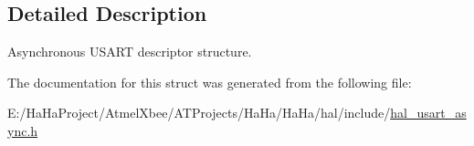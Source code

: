 \subsection{Detailed Description}
Asynchronous U\+S\+A\+RT descriptor structure. 

The documentation for this struct was generated from the following file\+:\begin{DoxyCompactItemize}
\item 
E\+:/\+Ha\+Ha\+Project/\+Atmel\+Xbee/\+A\+T\+Projects/\+Ha\+Ha/\+Ha\+Ha/hal/include/\hyperlink{hal__usart__async_8h}{hal\+\_\+usart\+\_\+async.\+h}\end{DoxyCompactItemize}
